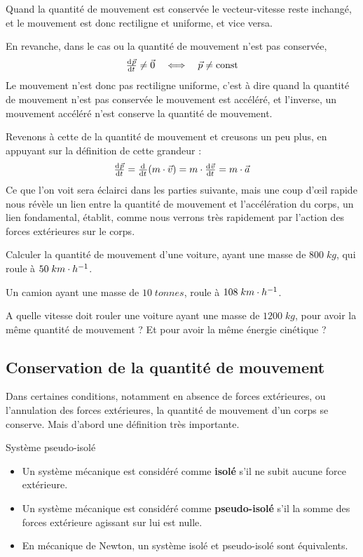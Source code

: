 \documentclass[11pt,a4paper]{article}
\begin{document}
Quand la quantité de mouvement est conservée le vecteur-vitesse reste inchangé, et le mouvement est donc rectiligne et uniforme, et vice versa. 

\endgroup

En revanche, dans le cas ou la quantité de mouvement n'est pas conservée, 
\[
\od{\vp}{t} \ne \Vec{0} \quad \Longleftrightarrow\quad \vp \ne \text{const}
\]
Le mouvement n'est donc pas rectiligne uniforme, c'est à dire quand la quantité de mouvement n'est pas conservée le mouvement est accéléré, et l'inverse, un mouvement accéléré n'est conserve la quantité de mouvement. 

Revenons à cette de la quantité de mouvement et creusons un peu plus, en appuyant sur la définition de cette grandeur : 
\[ \od{\vp}{t} = \od{}{t}(m\cdot\vv) = m\cdot\od{\vv}{t} = m\cdot\va \]
Ce que l'on voit sera éclairci dans les parties suivante, mais une coup d'\oe il rapide nous révèle un lien entre la quantité de mouvement et l'accélération du corps, un lien fondamental, établit, comme nous verrons très rapidement par l'action des forces extérieures sur le corps. 

\begin{exo}
Calculer la quantité de mouvement d’une voiture, ayant une masse de $800\; kg$, qui roule à $50\; km\cdot h^{-1}$. 
\vspace{2.5cm}
\end{exo}

\begin{exo}
Un camion ayant une masse de  $10\; tonnes$, roule à $108\; km\cdot h^{-1} $. 

A quelle vitesse doit rouler une voiture ayant une masse de $1200\; kg$, pour avoir la même quantité de mouvement ? Et pour avoir la même énergie cinétique ? 
\vspace{3cm}
\end{exo}

\subsection{Conservation de la quantité de mouvement}

Dans certaines conditions, notamment en absence de forces extérieures, ou l'annulation des forces extérieures, la quantité de mouvement d'un corps se conserve.  Mais d'abord une définition très importante.

\begin{defn}{Système pseudo-isolé}
\begin{itemize}
    \item Un système mécanique est considéré comme \textbf{isolé} s'il ne subit aucune force extérieure. 
    \item Un système mécanique est considéré comme \textbf{pseudo-isolé} s'il la somme des forces extérieure agissant sur lui est nulle. 
    \item En mécanique de Newton, un système isolé et pseudo-isolé sont équivalents. 
\end{itemize}
\end{defn}
\end{document}
